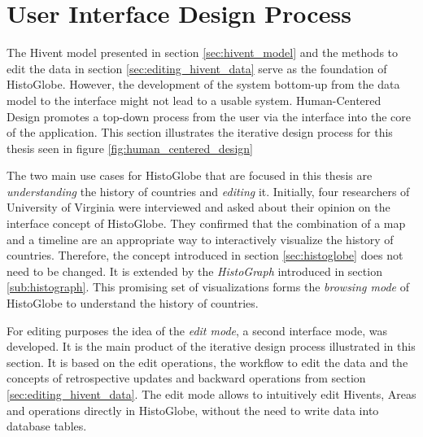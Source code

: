 
\section{User Interface Design Process} %
\label{sec:user_interface_design_process}

The Hivent model presented in section \ref{sec:hivent_model} and the methods to edit the data in section \ref{sec:editing_hivent_data} serve as the foundation of HistoGlobe. However, the development of the system bottom-up from the data model to the interface might not lead to a usable system. Human-Centered Design promotes a top-down process from the user via the interface into the core of the application. This section illustrates the iterative design process for this thesis seen in figure \ref{fig:human_centered_design}

The two main use cases for HistoGlobe that are focused in this thesis are \emph{understanding} the history of countries and \emph{editing} it. Initially, four researchers of University  of Virginia were interviewed and asked about their opinion on the interface concept of HistoGlobe. They confirmed that the combination of a map and a timeline are an appropriate way to interactively visualize the history of countries. Therefore, the concept introduced in section \ref{sec:histoglobe} does not need to be changed. It is extended by the \emph{HistoGraph} introduced in section \ref{sub:histograph}. This promising set of visualizations forms the \emph{browsing mode} of HistoGlobe to understand the history of countries.

For editing purposes the idea of the \emph{edit mode}, a second interface mode, was developed. It is the main product of the iterative design process illustrated in this section. It is based on the edit operations, the workflow to edit the data and the concepts of retrospective updates and backward operations from section \ref{sec:editing_hivent_data}. The edit mode allows to intuitively edit Hivents, Areas and operations directly in HistoGlobe, without the need to write data into database tables.



